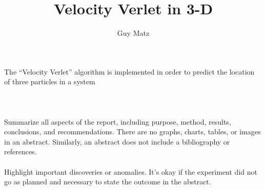 \documentclass[letterpaper,11pt,leqno]{article}
\begin{document}
\begin{titlepage}

\title{Velocity Verlet in 3-D}
\author{Guy Matz}

\maketitle
The ``Velocity Verlet'' algorithm is implemented in order to predict the location of three
particles in a system
\\~\\
\\~\\
Summarize all aspects of the report, including purpose, method, results, conclusions, and recommendations. There are no graphs, charts, tables, or images in an abstract. Similarly, an abstract does not include a bibliography or references.
\\~\\
Highlight important discoveries or anomalies. It's okay if the experiment did not go as planned and
necessary to state the outcome in the abstract.
\end{titlepage}

\end{document}
